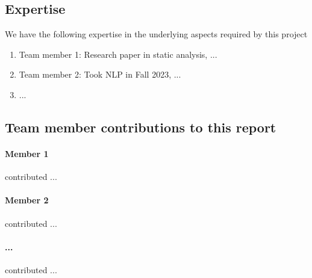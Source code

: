 \documentclass[11pt,a4paper]{article}
\begin{document}
\subsection{Expertise}
We have the following expertise in the underlying aspects required by this project
  \begin{enumerate}
      \item Team member 1: Research paper in static analysis, ...
      \item Team member 2: Took NLP in Fall 2023, ...
      \item ...
  \end{enumerate}


\subsection{Team member contributions to this report}
\paragraph{Member 1} contributed ...

\paragraph{Member 2} contributed ...

\paragraph{...} contributed ...

\clearpage



\end{document}
